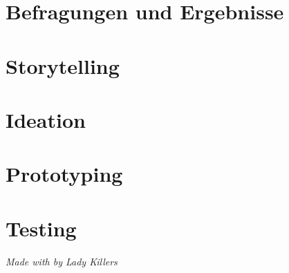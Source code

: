 \documentclass[12pt,ngerman, fleqn]{book} %
\begin{document}


\pagestyle{empty} %

\tableofcontents %

\tableoffigures

\pagestyle{fancy} %

\chapter{Befragungen und Ergebnisse}


\chapter{Storytelling}


\chapter{Ideation}


\chapter{Prototyping}


\chapter{Testing}



\vfill
\textit{Made with  by Lady Killers} \autocite{acknow}
\end{document}
